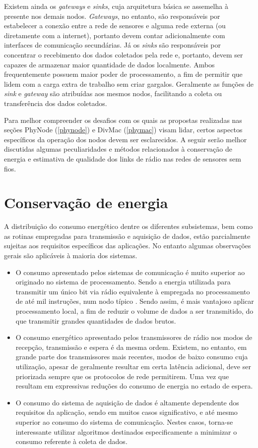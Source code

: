 \documentclass[
	12pt,				%
	openright,			%
	oneside,
	a4paper,			%
	english,			%
	french,				%
	spanish,			%
	brazil				%
	]{abntex2}
\begin{document}
Existem ainda os \textit{gateways} e \textit{sinks}, cuja arquitetura básica se assemelha à presente nos demais nodos. \textit{Gateways}, no entanto, são responsáveis por estabelecer a conexão entre a rede de sensores e alguma rede externa (ou diretamente com a internet), portanto devem contar adicionalmente com interfaces de comunicação secundárias. Já os \textit{sinks} são responsáveis por concentrar o recebimento dos dados coletados pela rede e, portanto, devem ser capazes de armazenar maior quantidade de dados localmente. Ambos frequentemente possuem maior poder de processamento, a fim de permitir que lidem com a carga extra de trabalho sem criar gargalos. Geralmente as funções de \textit{sink} e \textit{gateway} são atribuídas aos mesmos nodos, facilitando a coleta ou transferência dos dados coletados.

Para melhor compreender os desafios com os quais as propostas realizadas nas seções PhyNode (\ref{phynode}) e DivMac (\ref{phymac}) visam lidar, certos aspectos específicos da operação dos nodos devem ser esclarecidos. A seguir serão melhor discutidas algumas peculiaridades e métodos relacionados à conservação de energia e estimativa de qualidade dos links de rádio nas redes de sensores sem fios.

\section{Conservação de energia}
A distribuição do consumo energético dentre os diferentes subsistemas, bem como as rotinas empregadas para transmissão e aquisição de dados, estão parcialmente sujeitas aos requisitos específicos das aplicações. No entanto algumas observações gerais são aplicáveis à maioria dos sistemas.

\begin{itemize}
	\item O consumo apresentado pelos sistemas de comunicação é muito superior ao originado no sistema de processamento. Sendo a energia utilizada para transmitir um único bit via rádio equivalente à empregada no processamento de até mil instruções, num nodo típico \cite{Pottie2000}. Sendo assim, é mais vantajoso aplicar processamento local, a fim de reduzir o volume de dados a ser transmitido, do que transmitir grandes quantidades de dados brutos.
	\item O consumo energético apresentado pelos transmissores de rádio nos modos de recepção, transmissão e espera é da mesma ordem. Existem, no entanto, em grande parte dos transmissores mais recentes, modos de baixo consumo cuja utilização, apesar de geralmente resultar em certa latência adicional, deve ser priorizada sempre que os protocolos de rede permitirem. Uma vez que resultam em expressivas reduções do consumo de energia no estado de espera.
	\item O consumo do sistema de aquisição de dados é altamente dependente dos requisitos da aplicação, sendo em muitos casos significativo, e até mesmo superior ao consumo do sistema de comunicação. Nestes casos, torna-se interessante utilizar algoritmos destinados especificamente a minimizar o consumo referente à coleta de dados.
\end{itemize}
\end{document}
